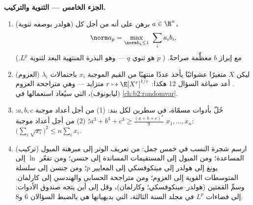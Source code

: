 \begin{problem}
\medskip
\noindent\textbf{الجزء الخامس --- الثنوية والتركيب.}
\begin{enumerate}[resume]
  \item (هولدر بوصفه ثنوية) برهن على أنه من أجل كل $a \in
        \R^n$،
        \[
        \norm a_p = \max_{\norm b_q \leq 1}\ \sum_i a_ib_i ,
        \]
        مع إبراز $b$ معظِّمة صراحةً. ( $p$
        هو ثنوي  $q$ --- وهو البذرة المنتهية البعد
        لثنوية $L^p$.)
  \item (العزوم) ليكن $X$ متغيرًا عشوائيًا يأخذ عددًا منتهيًا
        من القيم الموجبة $x_i$ باحتمالات
        $\lambda_i$. أعد صياغة السؤال 12 هكذا: $r \mapsto
        \E[X^r]^{1/r}$ متزايد --- وهي متراجحة العزوم
        (ليابونوف)، التي سيُعاد استعمالها في
        \cref{ch:b2:randomvar}.
  \item حُلّ بأدوات مسمّاة، في سطرين لكل بند: (1) من أجل
        أعداد موجبة $a, b, c$: $a^3 + b^3 + c^3 \geq
        \frac{(a+b+c)^3}{9}$؛ (2) من أجل أعداد موجبة $x_1, \dots,
        x_n$: $\bigl(\sum_i\sqrt{x_i}\bigr)^2 \leq
        n\sum_i x_i$.
  \item (تركيب) ارسم شجرة النسب في خمس جمل: من تعريف الوتر
        إلى مبرهنة الميول المساعدة؛ ومن الميول إلى المستقيمات المساندة إلى
        جنسن؛ ومن تقعّر $\ln$ إلى يونغ إلى هولدر إلى
        مينكوفسكي إلى المعايير $p$؛ ومن جنسن إلى سلسلة
        المتوسطات القوية إلى العزوم؛ ومن متراجحة الحسابي والهندسي إلى كارلمان. وسمِّ القمتين
        (هولدر--مينكوفسكي؛ وكارلمان)، وقل إلى أين يتجه
        صندوق الأدوات: إلى فضاءات $L^p$ في مجلد السنة
        الثالثة، التي بديهياتها هي بالضبط السؤالان 6 و8.
\end{enumerate}
\end{problem}
